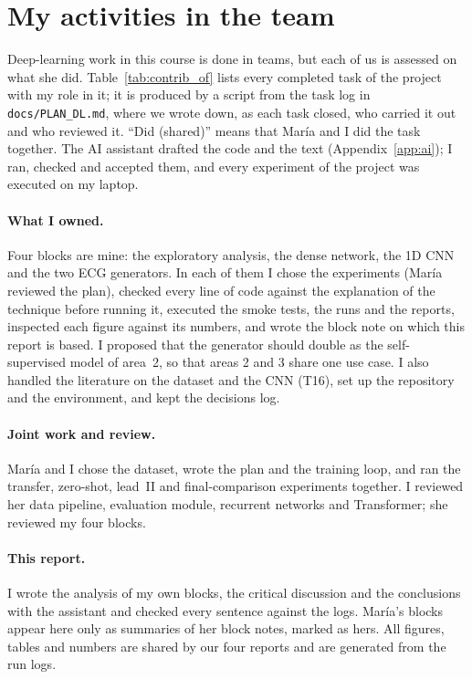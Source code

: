 \section{My activities in the team}\label{sec:activities}

Deep-learning work in this course is done in teams, but each of us is assessed on what she did. Table~\ref{tab:contrib_of}
lists every completed task of the project with my role in it; it is produced by a script from the task
log in \texttt{docs/PLAN\_DL.md}, where we wrote down, as each task closed, who carried it out and who
reviewed it. ``Did (shared)'' means that Mar\'ia and I did the task together. The AI assistant drafted
the code and the text (Appendix~\ref{app:ai}); I ran, checked and accepted them, and every experiment of
the project was executed on my laptop.

\begin{table}[H]
\centering
\caption{My role in each completed task (generated from \texttt{docs/PLAN\_DL.md}).}
\label{tab:contrib_of}

\end{table}

\paragraph{What I owned.} Four blocks are mine: the exploratory analysis, the dense network, the 1D CNN
and the two ECG generators. In each of them I chose the experiments (Mar\'ia reviewed the plan), checked
every line of code against the explanation of the technique before running it, executed the smoke tests,
the runs and the reports, inspected each figure against its numbers, and wrote the block note on which
this report is based. I proposed that the generator should double as the self-supervised model of
area~2, so that areas 2 and 3 share one use case. I also handled the literature on the dataset and the
CNN (T16), set up the repository and the environment, and kept the decisions log.

\paragraph{Joint work and review.} Mar\'ia and I chose the dataset, wrote the plan and the training loop,
and ran the transfer, zero-shot, lead~II and final-comparison experiments together. I reviewed her data
pipeline, evaluation module, recurrent networks and Transformer; she reviewed my four blocks.

\paragraph{This report.} I wrote the analysis of my own blocks, the critical discussion and the
conclusions with the assistant and checked every sentence against the logs. Mar\'ia's blocks appear here
only as summaries of her block notes, marked as hers. All figures, tables and numbers are shared by our
four reports and are generated from the run logs.
